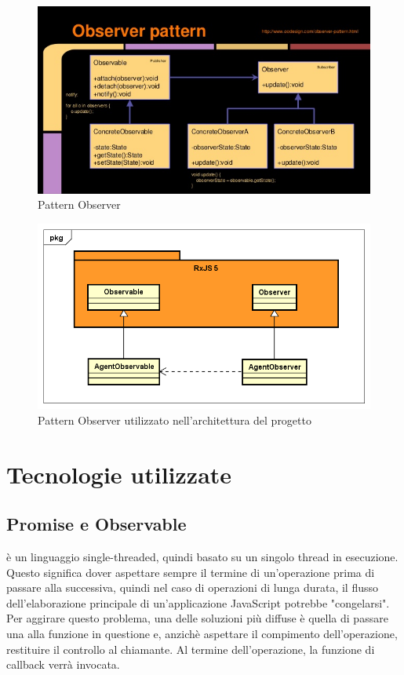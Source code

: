 	\begin{figure}[h]
		\centering
		\includegraphics[width=\textwidth,height=\textheight,keepaspectratio,scale=0.1]{images/observerpattern.png}
		\caption{Pattern Observer}\label{fig:obs1}
	\end{figure}
	\begin{figure}[h]
		\centering
		\includegraphics[width=\textwidth,height=\textheight,keepaspectratio,scale=0.1]{images/diagrams/back-end/Official_Backend_0304/Observer.png}
		\caption{Pattern Observer utilizzato nell'architettura del progetto \PROGETTO}\label{fig:obs2}
	\end{figure}
	\newpage
	\section{Tecnologie utilizzate}
	\subsection{Promise e Observable}


 è un linguaggio single-threaded, quindi basato su un singolo thread in esecuzione. Questo significa dover aspettare sempre il termine di un'operazione prima di passare alla
successiva, quindi nel caso di operazioni di lunga durata, il flusso dell'elaborazione principale di un’applicazione JavaScript potrebbe "congelarsi". \\
Per aggirare questo problema, una delle soluzioni più diffuse è quella di passare una  alla funzione in questione e, anzichè aspettare il compimento dell'operazione, restituire
il controllo al chiamante. Al termine dell'operazione, la funzione di callback verrà invocata. \\


